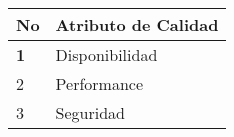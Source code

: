 \begin{table}[H]
\centering
\resizebox{6cm}{!} {
\begin{tabular}{|l|l|}
\hline
\textbf{No} & \textbf{Atributo de Calidad} \\ \hline
\textbf{1} & Disponibilidad \\ \hline
2 & Performance \\ \hline
3 & Seguridad \\ \hline
\end{tabular}
}
\end{table}